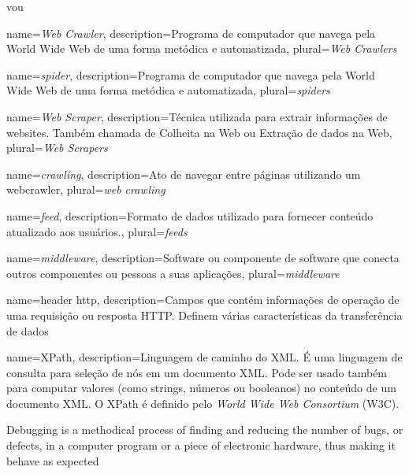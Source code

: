 vou %


				{name={\emph{Web Crawler}},
				 description={Programa de computador que navega pela World Wide Web de uma forma metódica e automatizada},
				 plural={\emph{Web Crawlers}}
				}

				{name={\emph{spider}},
				 description={Programa de computador que navega pela World Wide Web de uma forma metódica e automatizada},
				 plural={\emph{spiders}}
				}
				 
				{name={\emph{Web Scraper}},
				 description={Técnica utilizada para extrair informações de websites. Também chamada de Colheita na Web ou Extração de dados na Web},
				 plural={\emph{Web Scrapers}}
				 }
				 
				{name={\emph{crawling}},
				 description={Ato de navegar entre páginas utilizando um \gls{webcrawler}},
				 plural={\emph{web crawling}}
				}

				{name={\emph{feed}},
				 description={Formato de dados utilizado para fornecer conteúdo atualizado aos usuários.},
				 plural={\emph{feeds}}
				}

				{name={\emph{middleware}},
				 description={Software ou componente de software que conecta outros componentes ou pessoas a suas aplicações},
				 plural={\emph{middleware}}
				}
				
				{name={header http},
				 description={Campos que contém informações de operação de uma requisição ou resposta HTTP. Definem várias características da transferência de dados}
				}

				{name={XPath},
				 description={Linguagem de caminho do XML. É uma linguagem de consulta para seleção de nós em um documento XML. Pode ser usado também para computar valores (como strings, números ou booleanos) no conteúdo de um documento XML. O XPath é definido pelo \emph{World Wide Web Consortium} (W3C).}
				}

Debugging is a methodical process of finding and reducing the number of bugs, or defects, in a computer program or a piece of electronic hardware, thus making it behave as expected

